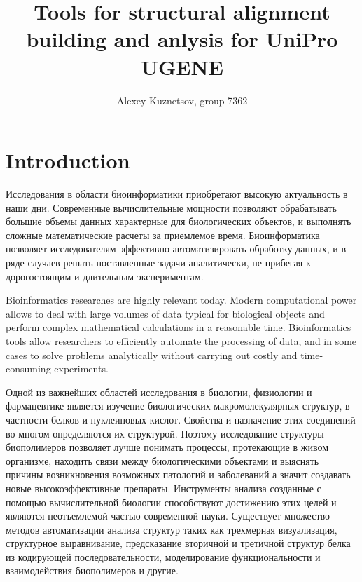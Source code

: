 \documentclass[a4paper, 12pt, titlepage, utf8]{extarticle}
\author{Alexey Kuznetsov, group 7362}
\title{Tools for structural alignment building and anlysis for UniPro UGENE}
\let\oldsection\section         %
\renewcommand{\section}{\newpage\oldsection}
\begin{document}


\tableofcontents
\newpage

\section{Introduction}      %
\begin{original}
Исследования в области биоинформатики приобретают высокую актуальность в наши
дни.
Современные вычислительные мощности позволяют обрабатывать большие объемы данных
характерные для биологических объектов, и выполнять сложные математические
расчеты за приемлемое время. Биоинформатика позволяет исследователям эффективно
автоматизировать обработку данных, и в ряде случаев решать поставленные задачи
аналитически, не прибегая к дорогостоящим и длительным экспериментам.
\end{original}

Bioinformatics researches are highly relevant today.
Modern computational power allows to deal with large volumes of data typical for
biological objects and perform complex mathematical calculations in a
reasonable time. Bioinformatics tools allow researchers to efficiently automate
the processing of data, and in some cases to solve problems analytically
without carrying out costly and time-consuming experiments.

\begin{original}
Одной из важнейших областей исследования в биологии, физиологии и фармацевтике
является изучение биологических макромолекулярных структур, в частности белков и
нуклеиновых кислот. Свойства и назначение этих соединений во многом определяются
их структурой. Поэтому исследование структуры биополимеров позволяет лучше
понимать процессы, протекающие в живом организме, находить связи между
биологическими объектами и выяснять причины возникновения возможных патологий и
заболеваний а значит создавать новые высокоэффективные препараты. Инструменты
анализа созданные с помощью вычислительной биологии способствуют достижению этих
целей и являются неотъемлемой частью современной науки. Существует множество
методов автоматизации анализа структур таких как трехмерная визуализация,
структурное выравнивание, предсказание вторичной и третичной структур белка из
кодирующей последовательности, моделирование функциональности и взаимодействия
биополимеров и другие.
\end{original}
\end{document}
